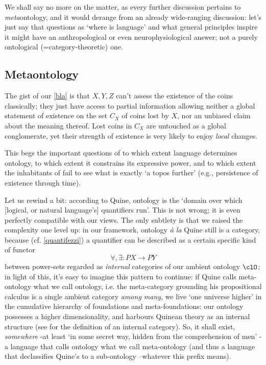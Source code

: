 We shall say no more on the matter, as every further discussion pertains to \emph{meta}ontology, and it would derange from an already wide-ranging discussion: let's just say that questions as `where is language' and what general principles inspire it might have an anthropological or even neurophysiological answer; not a purely ontological (=category-theoretic) one.

\subsection{Metaontology} \label{metaon}
The gist of our \autoref{bla} is that $X,Y,Z$ can't assess the existence of the coins classically; they just have access to partial information allowing neither a global statement of existence on the set $C_X$ of coins lost by $X$, nor an unbiased claim about the meaning thereof. Lost coins in $C_X$ are untouched as a global conglomerate, yet their strength of existence is very likely to enjoy \emph{local} changes.

This begs the important questions of to which extent language determines ontology, to which extent it constrains its expressive power, and to which extent the inhabitants of \tlon fail to see what is exactly `a topos further' (e.g., persistence of existence through time).

Let us rewind a bit: according to Quine, ontology is the `domain over which [logical, or natural language's] quantifiers run'. This is not wrong; it is even perfectly compatible with our views. The only subtlety is that we raised the complexity one level up: in our framework, ontology \emph{à la} Quine still is a category, because (cf. \autoref{quantifezzi}) a quantifier can be described as a certain specific kind of functor
\[\forall,\exists : PX \to PY\]
between power-sets regarded as \emph{internal} categories of our ambient ontology $\clO$; in light of this, it's easy to imagine this pattern to continue: if Quine calls meta-ontology what we call ontology, i.e. the meta-category grounding his propositional calculus is a single ambient category \emph{among many}, we live `one universe higher' in the cumulative hierarchy of foundations and meta-foundations: our ontology possesses a higher dimensionality, and harbours Quinean theory as an internal structure (see \cite[Ch. 8]{Bor1} for the definition of an internal category). So, it shall exist, \emph{somewhere} -at least `in some secret way, hidden from the comprehension of men' \cite{Borges1963}- a language that calls ontology what we call meta-ontology (and thus a language that declassifies Quine's to a sub-ontology --whatever this prefix means).

